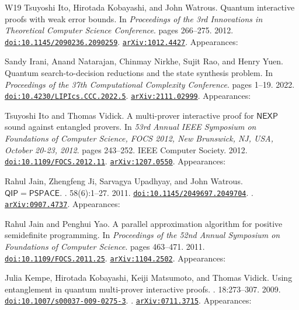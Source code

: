 \documentclass[10pt,a4paper]{article}
\numberwithin{equation}{section}
\numberwithin{figure}{section}
\begin{document}
\begin{thebibliography}{{}W19}
Tsuyoshi Ito, Hirotada Kobayashi, and John Watrous.
\newblock Quantum interactive proofs with weak error bounds.
\newblock In {\em Proceedings of the 3rd Innovations in Theoretical Computer Science Conference}. pages 266--275. 2012.
\newblock \href {https://doi.org/10.1145/2090236.2090259} {\texttt{doi:10.1145/2090236.2090259}}. \href {https://arxiv.org/abs/1012.4427} {\texttt{arXiv:1012.4427}}. Appearances:\!

Sandy Irani, Anand Natarajan, Chinmay Nirkhe, Sujit Rao, and Henry Yuen.
\newblock Quantum search-to-decision reductions and the state synthesis problem.
\newblock In {\em Proceedings of the 37th Computational Complexity Conference}. pages 1--19. 2022.
\newblock \href {https://doi.org/10.4230/LIPIcs.CCC.2022.5} {\texttt{doi:10.4230/LIPIcs.CCC.2022.5}}. \href {https://arxiv.org/abs/2111.02999} {\texttt{arXiv:2111.02999}}. Appearances:\!

Tsuyoshi Ito and Thomas Vidick.
\newblock A multi-prover interactive proof for $\mathsf{NEXP}$ sound against entangled provers.
\newblock In {\em 53rd Annual {IEEE} Symposium on Foundations of Computer Science, {FOCS} 2012, New Brunswick, NJ, USA, October 20-23, 2012}. pages 243--252. {IEEE} Computer Society. 2012.
\newblock \href {https://doi.org/10.1109/FOCS.2012.11} {\texttt{doi:10.1109/FOCS.2012.11}}. \href {https://arxiv.org/abs/1207.0550} {\texttt{arXiv:1207.0550}}. Appearances:\!

Rahul Jain, Zhengfeng Ji, Sarvagya Upadhyay, and John Watrous.
\newblock $\mathsf{QIP}=\mathsf{PSPACE}$.
. 58(6):1--27. 2011.
\newblock \href {https://doi.org/10.1145/2049697.2049704} {\texttt{doi:10.1145/2049697.2049704}}. . \href {https://arxiv.org/abs/0907.4737} {\texttt{arXiv:0907.4737}}. Appearances:\!

Rahul Jain and Penghui Yao.
\newblock A parallel approximation algorithm for positive semidefinite programming.
\newblock In {\em Proceedings of the 52nd Annual Symposium on Foundations of Computer Science}. pages 463--471. 2011.
\newblock \href {https://doi.org/10.1109/FOCS.2011.25} {\texttt{doi:10.1109/FOCS.2011.25}}. \href {https://arxiv.org/abs/1104.2502} {\texttt{arXiv:1104.2502}}. Appearances:\!

Julia Kempe, Hirotada Kobayashi, Keiji Matsumoto, and Thomas Vidick.
\newblock Using entanglement in quantum multi-prover interactive proofs.
. 18:273--307. 2009.
\newblock \href {https://doi.org/10.1007/s00037-009-0275-3} {\texttt{doi:10.1007/s00037-009-0275-3}}. . \href {https://arxiv.org/abs/0711.3715} {\texttt{arXiv:0711.3715}}. Appearances:\!


\end{thebibliography}
\end{document}
